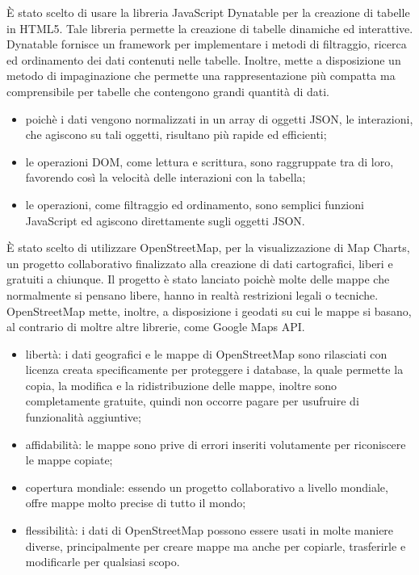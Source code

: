È stato scelto di usare la libreria JavaScript Dynatable per la creazione di tabelle in HTML5. Tale libreria permette la creazione di tabelle dinamiche ed interattive. Dynatable fornisce un framework per implementare i metodi di filtraggio, ricerca ed ordinamento dei dati contenuti nelle tabelle. Inoltre, mette a disposizione un metodo di impaginazione che permette una rappresentazione più compatta ma comprensibile per tabelle che contengono grandi quantità di dati.
\begin{itemize}
\item poichè i dati vengono normalizzati in un array di oggetti JSON, le interazioni, che agiscono su tali oggetti, risultano più rapide ed efficienti;
\item le operazioni DOM, come lettura e scrittura, sono raggruppate tra di loro, favorendo così la velocità delle interazioni con la tabella;
\item le operazioni, come filtraggio ed ordinamento, sono semplici funzioni JavaScript ed agiscono direttamente sugli oggetti JSON.
\end{itemize}

È stato scelto di utilizzare OpenStreetMap, per la visualizzazione di Map Charts, un progetto collaborativo finalizzato alla creazione di dati cartografici, liberi e gratuiti a chiunque. Il progetto è stato lanciato poichè molte delle mappe che normalmente si pensano libere, hanno in realtà restrizioni legali o tecniche. OpenStreetMap mette, inoltre, a disposizione i geodati su cui le mappe si basano, al contrario di moltre altre librerie, come Google Maps API.
\begin{itemize}
\item libertà: i dati geografici e le mappe di OpenStreetMap sono rilasciati con licenza creata specificamente per proteggere i database, la quale permette la copia, la modifica e la ridistribuzione delle mappe, inoltre sono completamente gratuite, quindi non occorre pagare per usufruire di funzionalità aggiuntive;
\item affidabilità: le mappe sono prive di errori inseriti volutamente per riconiscere le mappe copiate;
\item copertura mondiale: essendo un progetto collaborativo a livello mondiale, offre mappe molto precise di tutto il mondo;
\item flessibilità: i dati di OpenStreetMap possono essere usati in molte maniere diverse, principalmente per creare mappe ma anche per copiarle, trasferirle e modificarle per qualsiasi scopo.
\end{itemize}

